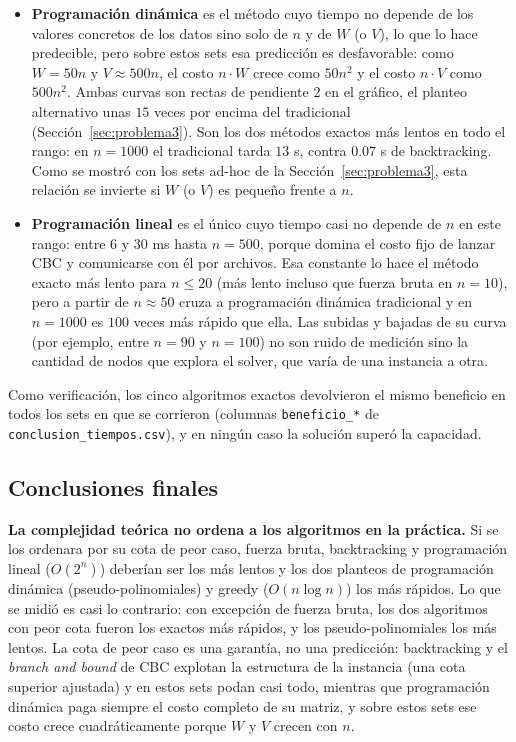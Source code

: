 \documentclass[11pt,a4paper]{article}
\begin{document}
\begin{itemize}
    \item \textbf{Programación dinámica} es el método cuyo tiempo no depende de los valores concretos de los datos sino solo de $n$ y de $W$ (o $V$), lo que lo hace predecible, pero sobre estos sets esa predicción es desfavorable: como $W = 50n$ y $V \approx 500n$, el costo $n \cdot W$ crece como $50n^2$ y el costo $n \cdot V$ como $500n^2$. Ambas curvas son rectas de pendiente $2$ en el gráfico, el planteo alternativo unas $15$ veces por encima del tradicional (Sección~\ref{sec:problema3}). Son los dos métodos exactos más lentos en todo el rango: en $n = 1000$ el tradicional tarda $13$ s, contra $0.07$ s de backtracking. Como se mostró con los sets ad-hoc de la Sección~\ref{sec:problema3}, esta relación se invierte si $W$ (o $V$) es pequeño frente a $n$.

    \item \textbf{Programación lineal} es el único cuyo tiempo casi no depende de $n$ en este rango: entre $6$ y $30$ ms hasta $n = 500$, porque domina el costo fijo de lanzar CBC y comunicarse con él por archivos. Esa constante lo hace el método exacto más lento para $n \le 20$ (más lento incluso que fuerza bruta en $n = 10$), pero a partir de $n \approx 50$ cruza a programación dinámica tradicional y en $n = 1000$ es $100$ veces más rápido que ella. Las subidas y bajadas de su curva (por ejemplo, entre $n = 90$ y $n = 100$) no son ruido de medición sino la cantidad de nodos que explora el solver, que varía de una instancia a otra.
\end{itemize}

Como verificación, los cinco algoritmos exactos devolvieron el mismo beneficio en todos los sets en que se corrieron (columnas \texttt{beneficio\_*} de \texttt{conclusion\_tiempos.csv}), y en ningún caso la solución superó la capacidad.

\subsection{Conclusiones finales}

\textbf{La complejidad teórica no ordena a los algoritmos en la práctica.} Si se los ordenara por su cota de peor caso, fuerza bruta, backtracking y programación lineal ($O(2^n)$) deberían ser los más lentos y los dos planteos de programación dinámica (pseudo-polinomiales) y greedy ($O(n \log n)$) los más rápidos. Lo que se midió es casi lo contrario: con excepción de fuerza bruta, los dos algoritmos con peor cota fueron los exactos más rápidos, y los pseudo-polinomiales los más lentos. La cota de peor caso es una garantía, no una predicción: backtracking y el \textit{branch and bound} de CBC explotan la estructura de la instancia (una cota superior ajustada) y en estos sets podan casi todo, mientras que programación dinámica paga siempre el costo completo de su matriz, y sobre estos sets ese costo crece cuadráticamente porque $W$ y $V$ crecen con $n$.
\end{document}
